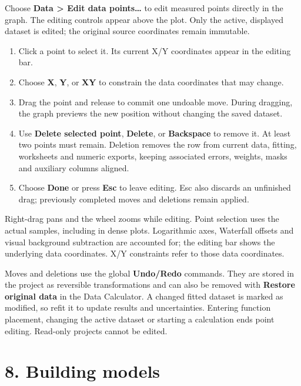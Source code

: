 \documentclass[
  10pt,
  a4paper,
  oneside]{scrreprt}
\providecommand{\tightlist}{%
  \setlength{\itemsep}{0pt}\setlength{\parskip}{0pt}}
\begin{document}
Choose \textbf{Data \textgreater{} Edit data points\ldots{}} to edit
measured points directly in the graph. The editing controls appear above
the plot. Only the active, displayed dataset is edited; the original
source coordinates remain immutable.

\begin{enumerate}
\def\labelenumi{\arabic{enumi}.}
\tightlist
\item
  Click a point to select it. Its current X/Y coordinates appear in the
  editing bar.
\item
  Choose \textbf{X}, \textbf{Y}, or \textbf{XY} to constrain the data
  coordinates that may change.
\item
  Drag the point and release to commit one undoable move. During
  dragging, the graph previews the new position without changing the
  saved dataset.
\item
  Use \textbf{Delete selected point}, \textbf{Delete}, or
  \textbf{Backspace} to remove it. At least two points must remain.
  Deletion removes the row from current data, fitting, worksheets and
  numeric exports, keeping associated errors, weights, masks and
  auxiliary columns aligned.
\item
  Choose \textbf{Done} or press \textbf{Esc} to leave editing. Esc also
  discards an unfinished drag; previously completed moves and deletions
  remain applied.
\end{enumerate}

Right-drag pans and the wheel zooms while editing. Point selection uses
the actual samples, including in dense plots. Logarithmic axes,
Waterfall offsets and visual background subtraction are accounted for;
the editing bar shows the underlying data coordinates. X/Y constraints
refer to those data coordinates.

Moves and deletions use the global \textbf{Undo/Redo} commands. They are
stored in the project as reversible transformations and can also be
removed with \textbf{Restore original data} in the Data Calculator. A
changed fitted dataset is marked as modified, so refit it to update
results and uncertainties. Entering function placement, changing the
active dataset or starting a calculation ends point editing. Read-only
projects cannot be edited.

\hypertarget{building-models}{%
\chapter{8. Building models}\label{building-models}}
\end{document}
